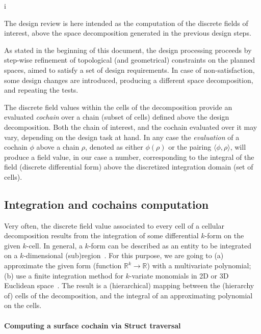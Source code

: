 i\documentclass[11pt,oneside]{article}    %
\def\R{\mathbb{R}}
\begin{document}
The design review is here intended as the computation of the discrete fields of interest,
above the space decomposition generated in the previous design steps. 

As stated in the beginning of this document, the design processing proceeds by step-wise refinement 
of topological (and geometrical) constraints on the planned spaces, aimed to satisfy
a set of design requirements. In case of non-satisfaction, some design changes are introduced, producing a different space decomposition, and repeating the tests.

The discrete field values within the cells of the decomposition provide an evaluated \emph{cochain} over 
a chain (subset of cells) defined above the design decomposition. Both the chain of interest, and the cochain evaluated over it may vary, depending on the design task at hand. In any case the \emph{evaluation} of a cochain $\phi$ above a chain $\rho$, denoted as either $\phi(\rho)$ or the pairing $\langle \phi,\rho \rangle$, will produce a field value, in our case a number, corresponding to the integral of the field (discrete differential form) above the discretized integration domain (set of cells).

\subsection{Integration and cochains computation}

Very often, the discrete field value associated to every cell of a cellular decomposition  results from the integration  of some differential $k$-form on the given $k$-cell.  In general, a $k$-form can be described as an entity to be integrated on a $k$-dimensional (sub)region~\cite{Desbrun:2005:DDF:1198555.1198666}.
For this purpose, we are going to  (a)  approximate the given form (function $\R^k \to \R$) with a multivariate polynomial;
(b)    use a finite integration method for $k$-variate monomials in 2D or 3D Euclidean space~\cite{CattaniP-BIL1990}.
The result is a (hierarchical) mapping between the (hierarchy of) cells of the decomposition, and the integral of an approximating polynomial on the cells.

\paragraph{Computing a surface cochain via Struct traversal}
\end{document}
